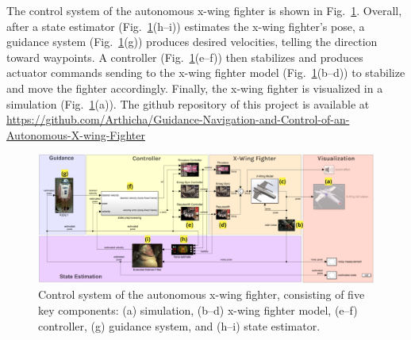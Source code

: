 
The control system of the autonomous x-wing fighter is shown in Fig.~\ref{fig:overview}. Overall, after a state estimator (Fig.~\ref{fig:overview}(h–i)) estimates the x-wing fighter's pose, a guidance system (Fig.~\ref{fig:overview}(g)) produces desired velocities, telling the direction toward waypoints. A controller (Fig.~\ref{fig:overview}(e–f)) then stabilizes and produces actuator commands sending to the x-wing fighter model (Fig.~\ref{fig:overview}(b–d)) to stabilize and move the fighter accordingly. Finally, the x-wing fighter is visualized in a simulation (Fig.~\ref{fig:overview}(a)). The github repository of this project is available at \href{https://github.com/Arthicha/Guidance-Navigation-and-Control-of-an-Autonomous-X-wing-Fighter}{\url{https://github.com/Arthicha/Guidance-Navigation-and-Control-of-an-Autonomous-X-wing-Fighter}}

\begin{figure}[!htbp]
	\centering
	\includegraphics[width=0.85\linewidth]{figures/overview}
	\caption{Control system of the autonomous x-wing fighter, consisting of five key components: (a) simulation, (b–d) x-wing fighter model, (e–f) controller, (g) guidance system, and (h–i) state estimator.}
	\label{fig:overview}
\end{figure}


